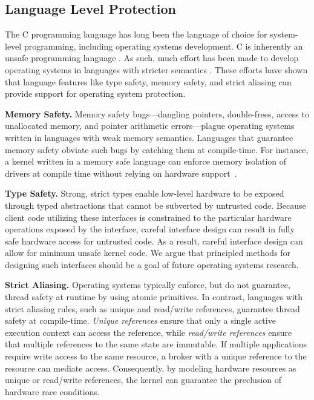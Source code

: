 \subsection{Language Level Protection}

The C programming language has long been the language of choice for system-level
programming, including operating systems development. C is inherently an unsafe
programming language \cite{kint:osdi2012, undefined:apsys2012}. As such, much
effort has been made to develop operating systems in languages with stricter
semantics \cite{singularity:sigops, house:icfp2005, unikernels:2013}. These
efforts have shown that language features like type safety, memory safety, and
strict aliasing can provide support for operating system protection.

{\bf Memory Safety.}
Memory safety bugs---dangling pointers, double-frees, access to unallocated
memory, and pointer arithmetic errors---plague operating systems written in
languages with weak memory semantics. Languages that guarantee memory safety
obviate such bugs by catching them at compile-time. For instance, a kernel
written in a memory safe language can enforce memory isolation of drivers at
compile time without relying on hardware support~\cite{spin:sosp}.

{\bf Type Safety.}
Strong, strict types enable low-level hardware to be exposed through typed
abstractions that cannot be subverted by untrusted code. Because client code
utilizing these interfaces is constrained to the particular hardware operations
exposed by the interface, careful interface design can result in fully safe
hardware access for untrusted code. As a result, careful interface design can
allow for minimum unsafe kernel code. We argue that principled methods for
designing such interfaces should be a goal of future operating systems research.

{\bf Strict Aliasing.}
Operating systems typically enforce, but do not guarantee, thread safety at
runtime by using atomic primitives. In contrast, languages with strict aliasing
rules, such as unique and read/write references, guarantee thread safety at
compile-time. \textit{Unique references} ensure that only a single active
execution context can access the reference, while \textit{read/write references}
ensure that multiple references to the same state are immutable. If multiple
applications require write access to the same resource, a broker with a unique
reference to the resource can mediate access. Consequently, by modeling hardware
resources as unique or read/write references, the kernel can guarantee the
preclusion of hardware race conditions.
